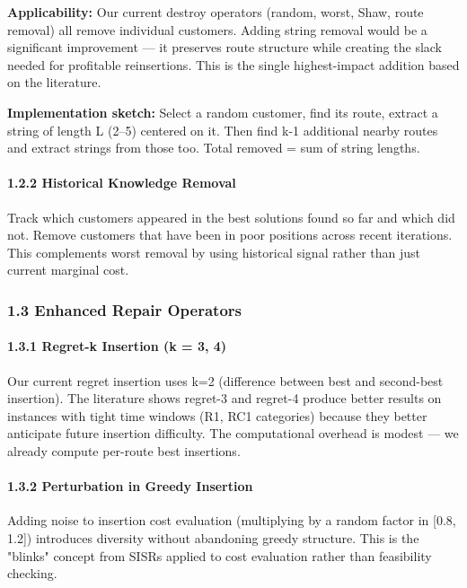 \documentclass[twocolumn,10pt,letterpaper]{article}
\begin{document}
\textbf{Applicability:} Our current destroy operators (random, worst, Shaw, route removal) all remove individual customers. Adding string removal would be a significant improvement --- it preserves route structure while creating the slack needed for profitable reinsertions. This is the single highest-impact addition based on the literature.


\textbf{Implementation sketch:} Select a random customer, find its route, extract a string of length L (2--5) centered on it. Then find k-1 additional nearby routes and extract strings from those too. Total removed = sum of string lengths.


\paragraph{1.2.2 Historical Knowledge Removal}

Track which customers appeared in the best solutions found so far and which did not. Remove customers that have been in poor positions across recent iterations. This complements worst removal by using historical signal rather than just current marginal cost.


\subsubsection{1.3 Enhanced Repair Operators}

\paragraph{1.3.1 Regret-k Insertion (k = 3, 4)}

Our current regret insertion uses k=2 (difference between best and second-best insertion). The literature shows regret-3 and regret-4 produce better results on instances with tight time windows (R1, RC1 categories) because they better anticipate future insertion difficulty. The computational overhead is modest --- we already compute per-route best insertions.


\paragraph{1.3.2 Perturbation in Greedy Insertion}

Adding noise to insertion cost evaluation (multiplying by a random factor in [0.8, 1.2]) introduces diversity without abandoning greedy structure. This is the "blinks" concept from SISRs applied to cost evaluation rather than feasibility checking.
\end{document}
